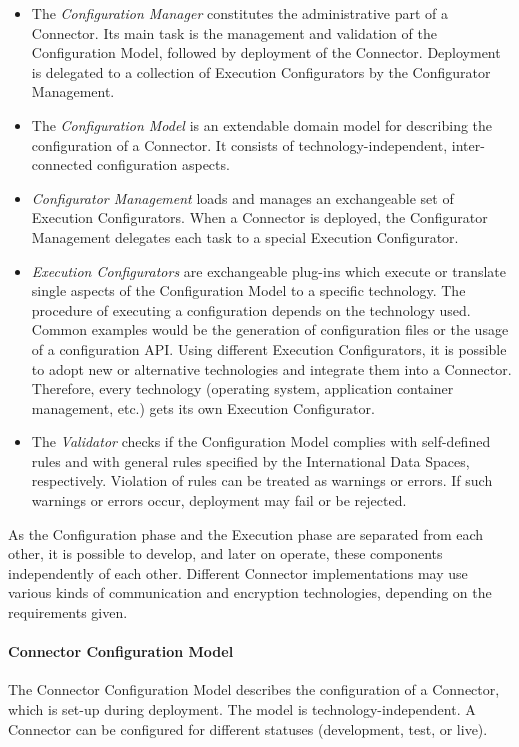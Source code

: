 \begin{itemize}
	\item The \textit{Configuration Manager} constitutes the administrative part of a Connector. Its main task is the management and validation of the Configuration Model, followed by deployment of the Connector. Deployment is delegated to a collection of Execution Configurators by the Configurator Management.

	\item The \textit{Configuration Model} is an extendable domain model for describing the configuration of a Connector. It consists of technology-independent, inter-connected configuration aspects.

	\item \textit{Configurator Management} loads and manages an exchangeable set of Execution Configurators. When a Connector is deployed, the Configurator Management delegates each task to a special Execution Configurator.

	\item \textit{Execution Configurators} are exchangeable plug-ins which execute or translate single aspects of the Configuration Model to a specific technology. The procedure of executing a configuration depends on the technology used. Common examples would be the generation of configuration files or the usage of a configuration API. Using different Execution Configurators, it is possible to adopt new or alternative technologies and integrate them into a Connector. Therefore, every technology (operating system, application container management, etc.) gets its own Execution Configurator.

	\item The \textit{Validator} checks if the Configuration Model complies with self-defined rules and with general rules specified by the International Data Spaces, respectively. Violation of rules can be treated as warnings or errors. If such warnings or errors occur, deployment may fail or be rejected.
\end{itemize}

As the Configuration phase and the Execution phase are separated from each other, it is possible to develop, and later on operate, these components independently of each other. Different Connector implementations may use various kinds of communication and encryption technologies, depending on the requirements given.

\paragraph{Connector Configuration Model\\}
The Connector Configuration Model describes the configuration of a Connector, which is set-up during deployment. The model is technology-independent. A Connector can be configured for different statuses (development, test, or live). 



